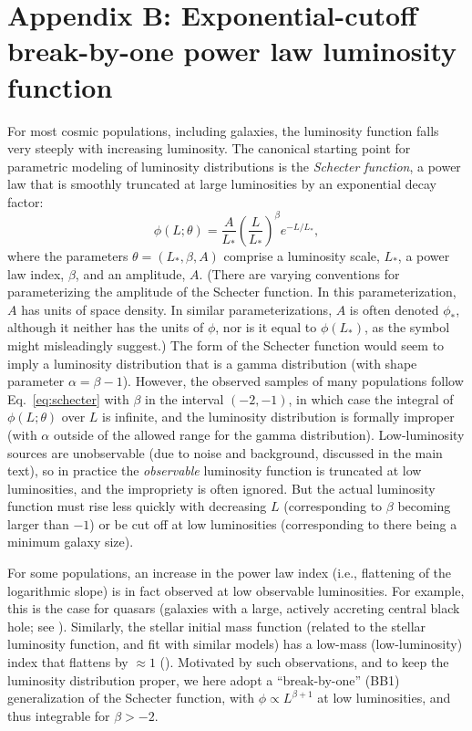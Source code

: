 \documentclass[12pt]{article}
\numberwithin{equation}{section}
\numberwithin{figure}{section}
\numberwithin{table}{section}
\newcommand{\lfunc}{\phi}  %
\begin{document}
\section*{Appendix B: Exponential-cutoff \\break-by-one power law luminosity function}
\renewcommand{\theequation}{B.\arabic{equation}}
\renewcommand{\thefigure}{B.\arabic{figure}}

For most cosmic populations, including galaxies, the luminosity function falls very steeply with increasing luminosity.
The canonical starting point for parametric modeling of luminosity distributions is the \emph{Schecter function}, a power law that is smoothly truncated at large luminosities by an exponential decay factor:
\begin{equation}
\lfunc(L;\theta) =
  \frac{A}{L_*} \left(\frac{L}{L_*}\right)^{\beta} e^{-L/L_*},
\label{eq:schecter}
\end{equation}
where the parameters $\theta = (L_*,\beta, A)$ comprise a luminosity scale, $L_*$, a power law index, $\beta$, and an amplitude, $A$.
(There are varying conventions for parameterizing the amplitude of the Schecter function.
In this parameterization, $A$ has units of space density.
In similar parameterizations, $A$ is often denoted $\lfunc_*$, although it neither has the units of $\lfunc$, nor is it equal to $\lfunc(L_*)$, as the symbol might misleadingly suggest.)
The form of the Schecter function would seem to imply a luminosity distribution that is a gamma distribution (with shape parameter $\alpha = \beta - 1$).
However, the observed samples of many populations follow Eq.~\ref{eq:schecter} with $\beta$ in the interval $(-2,-1)$, in which case the integral of $\lfunc(L;\theta)$ over $L$ is infinite, and the luminosity distribution is formally improper (with $\alpha$ outside of the allowed range for the gamma distribution).
Low-luminosity sources are unobservable (due to noise and background, discussed in the main text), so in practice the \emph{observable} luminosity function is truncated at low luminosities, and the impropriety is often ignored.
But the actual luminosity function must rise less quickly with decreasing $L$ (corresponding to $\beta$ becoming larger than $-1$) or be cut off at low luminosities (corresponding to there being a minimum galaxy size).

For some populations, an increase in the power law index (i.e., flattening of the logarithmic slope) is in fact observed at low observable luminosities.
For example, this is the case for quasars (galaxies with a large, actively accreting central black hole; see \citealt{M+13-QuasarLumFunc}).
Similarly, the stellar initial mass function (related to the stellar luminosity function, and fit with similar models) has a low-mass (low-luminosity) index that flattens by $\approx 1$ (\citealt{K07-IMF-BPL}).
Motivated by such observations, and to keep the luminosity distribution proper, we here adopt a ``break-by-one'' (BB1) generalization of the Schecter function, with $\lfunc \propto L^{\beta+1}$ at low luminosities, and thus integrable for $\beta > -2$.
\end{document}
